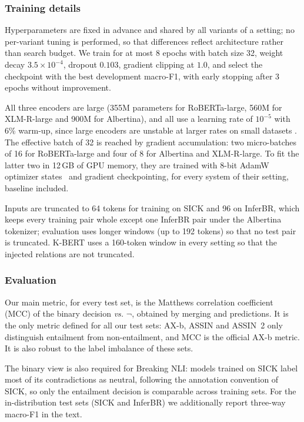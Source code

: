 \subsubsection{Training details}
\label{sec:hyper}

Hyperparameters are fixed in advance and shared by all variants of a setting; no per-variant tuning is
performed, so that differences reflect architecture rather than search budget. We train for at most 8
epochs with batch size 32, weight decay $3.5\times10^{-4}$, dropout $0.103$, gradient clipping at $1.0$,
and select the checkpoint with the best development macro-F1, with early stopping after 3 epochs without
improvement.

All three encoders are large (355M parameters for RoBERTa-large, 560M for XLM-R-large and 900M for
Albertina), and all use a learning rate of $10^{-5}$ with 6\% warm-up, since large encoders are unstable at
larger rates on small datasets \citep{mosbach2021stability}. The effective batch of 32 is reached by
gradient accumulation: two micro-batches of 16 for RoBERTa-large and four of 8 for Albertina and XLM-R-large.
To fit the latter two in 12\,GB of GPU memory, they are trained with 8-bit AdamW optimizer
states~\citep{dettmers2022optimizers} and gradient checkpointing, for every system of their setting,
\cls{} baseline included.

Inputs are truncated to 64 tokens for training on SICK and 96 on InferBR, which keeps every training pair
whole except one InferBR pair under the Albertina tokenizer; evaluation uses longer windows (up to
192 tokens) so that no test pair is truncated. K-BERT uses a 160-token window in every setting so that
the injected relations are not truncated.

\subsubsection{Evaluation}
\label{sec:evaluation}

Our main metric, for every test set, is the Matthews correlation coefficient (MCC) of the binary
decision \E{} \emph{vs.} $\neg$\E{}, obtained by merging \N{} and \C{} predictions. It is the only metric
defined for all our test sets: AX-b, ASSIN and ASSIN~2 only distinguish entailment from non-entailment,
and MCC is the official AX-b metric. It is also robust to the label imbalance of these sets.

The binary view is also required for Breaking NLI: models trained on SICK label most of its
contradictions as neutral, following the annotation convention of SICK, so only the entailment decision
is comparable across training sets. For the in-distribution test sets (SICK and InferBR) we additionally
report three-way macro-F1 in the text.

